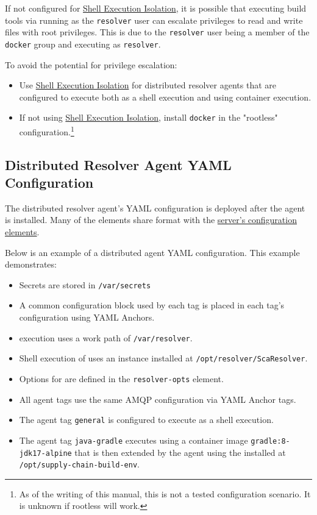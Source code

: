 If not configured for \hyperref[par:shell-agent-isolation]{Shell Execution Isolation}, it is possible that
executing build tools via \scaresolver running as the \texttt{resolver} user can escalate privileges
to read and write files with root privileges.  This is due to the \texttt{resolver} user being a member of
the \texttt{docker} group and \scaresolver executing as \texttt{resolver}.  

To avoid the potential for privilege escalation:

\begin{itemize}
  \item Use \hyperref[par:shell-agent-isolation]{Shell Execution Isolation} for distributed resolver agents that are configured
    to execute \scaresolver both as a shell execution and using container execution.
  \item If not using \hyperref[par:shell-agent-isolation]{Shell Execution Isolation}, install \texttt{docker} in the "rootless"
    configuration.\footnote{As of the writing of this manual, this is not a tested configuration scenario.  It is unknown if rootless will work.}
\end{itemize}



\subsection{Distributed Resolver Agent YAML Configuration}

The distributed resolver agent's YAML configuration is deployed after the agent is installed.
Many of the elements share format with the \hyperref[sec:yaml-config]{server's configuration elements}. 


Below is an example of a distributed agent YAML configuration.  This example demonstrates:

\begin{itemize}
  \item Secrets are stored in \texttt{/var/secrets}
  \item A common configuration block used by each tag is placed in each tag's configuration using YAML Anchors.
  \item \scaresolver execution uses a work path of \texttt{/var/resolver}.
  \item Shell execution of \scaresolver uses an instance installed at \texttt{/opt/resolver/ScaResolver}.
  \item Options for \scaresolver are defined in the \texttt{resolver-opts} element.
  \item All agent tags use the same AMQP configuration via YAML Anchor tags.
  \item The agent tag \texttt{general} is configured to execute \scaresolver as a shell execution.
  \item The agent tag \texttt{java-gradle} executes \scaresolver using a container image \texttt{gradle:8-jdk17-alpine} that
    is then extended by the agent using the \toolkit installed at\\\texttt{/opt/supply-chain-build-env}.
\end{itemize}

